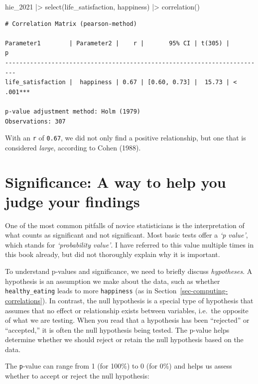 \documentclass[
  letterpaper,
]{krantz}
\makeatletter
\newenvironment{Shaded}{\begin{snugshade}}{\end{snugshade}}
\newcommand{\FunctionTok}[1]{\textcolor[rgb]{0.28,0.35,0.67}{#1}}
\newcommand{\NormalTok}[1]{\textcolor[rgb]{0.00,0.23,0.31}{#1}}
\newcommand{\SpecialCharTok}[1]{\textcolor[rgb]{0.37,0.37,0.37}{#1}}
\newenvironment{kframe}{%
\medskip{}
\setlength{\fboxsep}{.8em}
 \def\at@end@of@kframe{}%
 \ifinner\ifhmode%
  \def\at@end@of@kframe{\end{minipage}}%
  \begin{minipage}{\columnwidth}%
 \fi\fi%
 \def\FrameCommand##1{\hskip\@totalleftmargin \hskip-\fboxsep
 \colorbox{shadecolor}{##1}\hskip-\fboxsep
     \hskip-\linewidth \hskip-\@totalleftmargin \hskip\columnwidth}%
 \MakeFramed {\advance\hsize-\width
   \@totalleftmargin\z@ \linewidth\hsize
   \@setminipage}}%
 {\par\unskip\endMakeFramed%
 \at@end@of@kframe}
\renewenvironment{Shaded}{\begin{kframe}}{\end{kframe}}
\makeatother
\begin{document}
\begin{Shaded}
\begin{Highlighting}[]
\NormalTok{hie\_2021 }\SpecialCharTok{|\textgreater{}}
  \FunctionTok{select}\NormalTok{(life\_satisfaction, happiness) }\SpecialCharTok{|\textgreater{}}
  \FunctionTok{correlation}\NormalTok{()}
\end{Highlighting}
\end{Shaded}

\begin{verbatim}
# Correlation Matrix (pearson-method)

Parameter1        | Parameter2 |    r |       95% CI | t(305) |         p
-------------------------------------------------------------------------
life_satisfaction |  happiness | 0.67 | [0.60, 0.73] |  15.73 | < .001***

p-value adjustment method: Holm (1979)
Observations: 307
\end{verbatim}

With an \texttt{r} of \texttt{0.67}, we did not only find a positive
relationship, but one that is considered \emph{large}, according to
Cohen (1988).

\section{Significance: A way to help you judge your
findings}\label{sec-significance}

One of the most common pitfalls of novice statisticians is the
interpretation of what counts as significant and not significant. Most
basic tests offer a \emph{`p value'}, which stands for
\emph{`probability value'}. I have referred to this value multiple times
in this book already, but did not thoroughly explain why it is
important.

To understand p-values and significance, we need to briefly discuss
\emph{hypotheses}. A hypothesis is an assumption we make about the data,
such as whether \texttt{healthy\_eating} leads to more
\texttt{happiness} (as in Section~\ref{sec-computing-correlations}). In
contrast, the null hypothesis is a special type of hypothesis that
assumes that no effect or relationship exists between variables,
i.e.~the opposite of what we are testing. When you read that a
hypothesis has been ``rejected'' or ``accepted,'' it is often the null
hypothesis being tested. The p-value helps determine whether we should
reject or retain the null hypothesis based on the data.

The \texttt{p}-value can range from 1 (for 100\%) to 0 (for 0\%) and
helps us assess whether to accept or reject the null hypothesis:
\end{document}
